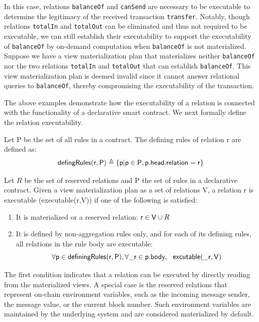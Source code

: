 In this case, relations {\sf \lstinline{balanceOf}} and {\sf \lstinline{canSend}} 
are necessary to be executable to determine the legitimacy of the received transaction {\sf \lstinline{transfer}}.
Notably, though relations {\sf \lstinline{totalIn}} and {\sf \lstinline{totalOut}} can be eliminated and thus not required to be executable, we can still establish their executability to support the executability of {\sf \lstinline{balanceOf}} by on-demand computation when {\sf \lstinline{balanceOf}} is not materialized. 
Suppose we have a view materialization plan that materializes neither {\sf \lstinline{balanceOf}} 
nor the two relations {\sf \lstinline{totalIn}} and {\sf \lstinline{totalOut}} that can establish {\sf \lstinline{balanceOf}}.
This view materialization plan is deemed invalid since it cannot answer relational queries to {\sf \lstinline{balanceOf}},  thereby compromising the executability of the transaction.

The above examples demonstrate how the executability of a relation is connected with the functionality of a declarative smart contract. We next formally define the relation executability.

\begin{deff}\label{def:defining-rules}
    Let {\sf P} be the set of all rules in a contract. The defining rules of relation {\sf r} are defined as:
        \[ {\sf defingRules(r,P)} \triangleq \{ {\sf p} | {\sf p} \in {\sf P}, {\sf p.head.relation = r} \} \]
    
\end{deff}

\begin{deff}\label{def:excutable-relation}
    Let $R$ be the set of reserved relations and {\sf P} the set of rules in a declarative contract.
    Given a view materialization plan as a set of relations {\sf V},
    a relation {\sf r} is executable ({\sf executable(r,V)}) if one of the following is satisfied:
    \begin{enumerate}
        \item It is materialized or a reserved relation: 
            ${\sf r} \in {\sf V} \cup R$
        \item 
        It is defined by non-aggregation rules only, and for each of its defining rules, all relations in the rule body are executable:
            \[ \forall {\sf p} \in {\sf definingRules(r,P)}, \forall {\sf \_r} \in {\sf p.body}, ~~ {\sf excutable(\_r,V)}  \]
    \end{enumerate}
\end{deff}
The first condition indicates that a relation can be executed by directly reading from the materialized views.
A special case is the reserved relations that represent on-chain environment variables, such as the incoming message sender, the message value, or the current block number. Such environment variables are maintained by the underlying system and are considered materialized by default.

